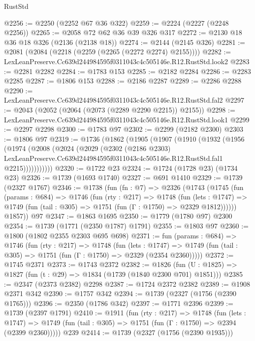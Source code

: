 \begin{lexlean}{RustStd}
\begin{coremodule}
@2256 := @2250 (@2252 @67 @36 @322)
@2259 := @2224 (@2227 (@2248 @2256))
@2265 := @2058 @72 @62 @36 @39 @326 @317
@2272 := @2130 @18 @36 @18 @326 (@2136 (@2138 @18))
@2274 := @2144 (@2145 @326)
@2281 := @2081 (@2084 (@2218 (@2259 (@2265 (@2272 @2274) @2155))))
@2282 := LexLeanPreserve.Cc639d244984595f0311043c4c505146e.R12.RustStd.look2
@2283 := @2281 @2282
@2284 := @1783 @153
@2285 := @2182 @2284
@2286 := @2283 @2285
@2287 := @1806 @153
@2288 := @2186 @2287
@2289 := @2286 @2288
@2290 := LexLeanPreserve.Cc639d244984595f0311043c4c505146e.R12.RustStd.fal2
@2297 := @2043 (@2052 (@2064 (@2073 (@2289 @2290 @2215)) @2155))
@2298 := LexLeanPreserve.Cc639d244984595f0311043c4c505146e.R12.RustStd.look1
@2299 := @2297 @2298
@2300 := @1783 @97
@2302 := @2299 (@2182 @2300)
@2303 := @1806 @97
@2319 := @1736
    (@1862
      (@1905
        (@1907
          (@1910
            (@1932
              (@1956
                (@1974
                  (@2008
                    (@2024
                      (@2029
                        (@2302
                          (@2186 @2303)
                          LexLeanPreserve.Cc639d244984595f0311043c4c505146e.R12.RustStd.fal1
                          @2215)))))))))))
@2320 := @1722 @23
@2324 := @1724 (@1728 @23) (@1734 @23)
@2326 := @1739 (@1693 @1740)
@2327 := @691 @1410
@2329 := @1739 (@2327 @1767)
@2346 := @1738
    (fun (fn : @7) =>
    @2326
      (@1743
        (@1745
          (fun (params : @684) =>
          @1746
            (fun (rty : @217) =>
            @1748
              (fun (lets : @1747) =>
              @1749 (fun (tail : @305) => @1751 (fun (Γ : @1750) => @2329 @1812))))))
        @1857))
    @97
@2347 := @1863 @1695
@2350 := @1779 (@1780 @97) @2300
@2354 := @1739 (@1771 (@2350 @1787) @1791)
@2355 := @1803 @97
@2360 := @1800 (@1802 @2355 @2303 @695 @698)
@2371 := fun (params : @684) =>
  @1746
    (fun (rty : @217) =>
    @1748
      (fun (lets : @1747) =>
      @1749 (fun (tail : @305) => @1751 (fun (Γ : @1750) => @2329 (@2354 @2360)))))
@2372 := @1745 @2371
@2373 := @1743 @2372
@2382 := @1826 (fun (U : @1825) => @1827 (fun (t : @29) => @1834 (@1739 (@1840 @2300 @701) @1851)))
@2385 := @2347 (@2373 @2382) @2298
@2387 := @1724 @2372 @2382
@2389 := @1908 @2371 @342
@2390 := @1757 @342
@2394 := @1739 (@2327 (@1756 (@2390 @1765)))
@2396 := @2350 (@1786 @342)
@2397 := @1771 @2396
@2399 := @1739 (@2397 @1791)
@2410 := @1911
    (fun (rty : @217) =>
    @1748
      (fun (lets : @1747) =>
      @1749 (fun (tail : @305) => @1751 (fun (Γ : @1750) => @2394 (@2399 @2360)))))
    @239
@2414 := @1739 (@2327 (@1756 (@2390 @1935)))

\end{coremodule}
\end{lexlean}
